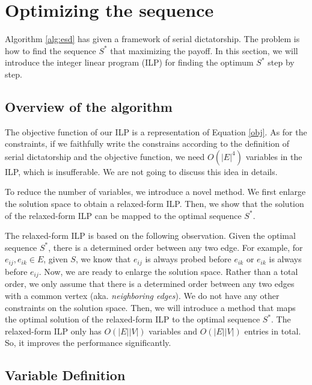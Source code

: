 \documentclass[letterpaper]{article}
\begin{document}
\section{Optimizing the sequence}

Algorithm \ref{alg:esd} has given a framework of serial dictatorship. 
The problem is how to find the sequence $S^*$ that maximizing the payoff.
In this section, we will introduce the integer linear program (ILP) for finding the optimum $S^*$ step by step.

\subsection{Overview of the algorithm}

The objective function of our ILP is a representation of Equation \ref{obj}.
As for the constraints, if we faithfully write the constrains according to the definition of serial dictatorship and the objective function, we need $O(|E|^4)$ variables in the ILP, which is insufferable. We are not going to discuss this idea in details.

To reduce the number of variables, we introduce a novel method.
We first enlarge the solution space to obtain a relaxed-form ILP.
Then, we show that the solution of the relaxed-form ILP can be mapped to the optimal sequence $S^*$.

The relaxed-form ILP is based on the following observation.
Given the optimal sequence $S^*$, there is a determined order between any two edge.
For example, for $e_{ij}, e_{ik}\in E$, given $S$, we know that $e_{ij}$ is always probed before $e_{ik}$ or $e_{ik}$ is always before $e_{ij}$.
Now, we are ready to enlarge the solution space.
Rather than a total order, we only assume that there is a determined order between any two edges with a common vertex (aka. \textit{neighboring edges}).
We do not have any other constraints on the solution space.
Then, we will introduce a method that maps the optimal solution of the relaxed-form ILP to the optimal sequence $S^*$.
The relaxed-form ILP only has $O(|E||V|)$ variables and $O(|E||V|)$ entries in total.
So, it improves the performance significantly.

\subsection{Variable Definition}
\end{document}
